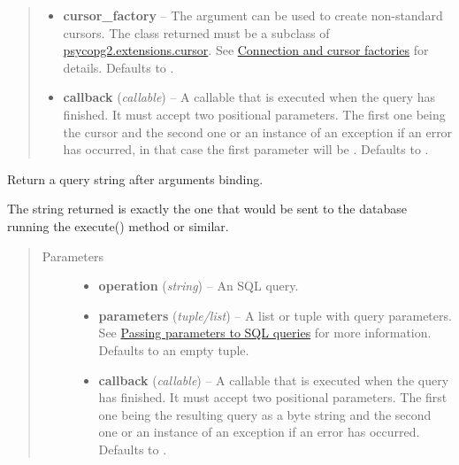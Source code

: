 \documentclass[letterpaper,10pt,english]{sphinxmanual}
\begin{document}
\begin{fulllineitems}
\begin{fulllineitems}
\begin{quote}
\begin{description}
\begin{itemize}
\item {} 
\textbf{cursor\_factory} -- The  argument can be used to create non-standard cursors.
The class returned must be a subclass of \href{http://initd.org/psycopg/docs/extensions.html\#psycopg2.extensions.cursor}{psycopg2.extensions.cursor}.
See \href{http://initd.org/psycopg/docs/advanced.html\#subclassing-cursor}{Connection and cursor factories} for details. Defaults to .

\item {} 
\textbf{callback} (\emph{callable}) -- A callable that is executed when the query has finished. It must accept
two positional parameters. The first one being the cursor and the second
one  or an instance of an exception if an error has occurred,
in that case the first parameter will be . Defaults to .

\end{itemize}

\end{description}\end{quote}

\end{fulllineitems}


\begin{fulllineitems}
\label{api:momoko.Connection.mogrify}
Return a query string after arguments binding.

The string returned is exactly the one that would be sent to the database
running the execute() method or similar.
\begin{quote}\begin{description}
\item[{Parameters}] \leavevmode\begin{itemize}
\item {} 
\textbf{operation} (\emph{string}) -- An SQL query.

\item {} 
\textbf{parameters} (\emph{tuple/list}) -- A list or tuple with query parameters. See \href{http://initd.org/psycopg/docs/usage.html\#query-parameters}{Passing parameters to SQL queries}
for more information. Defaults to an empty tuple.

\item {} 
\textbf{callback} (\emph{callable}) -- A callable that is executed when the query has finished. It must accept
two positional parameters. The first one being the resulting query as
a byte string and the second one  or an instance of an exception
if an error has occurred. Defaults to .


\end{itemize}
\end{description}
\end{quote}
\end{fulllineitems}
\end{fulllineitems}
\end{document}
